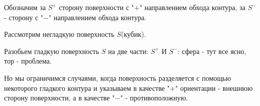 Обозначим за $S^+$ сторону поверхности с "$+$" направлением обхода контура, за $S^-$ - сторону с "$-$" направлением обхода контура.

Рассмотрим негладкую поверхность $S$(кубик). 

Разобьем гладкую поверхность $S$ на две части: $S^+$ И $S^-$: сфера - тут все ясно, тор - проблема.

Но мы ограничимся случаями, когда поверхность разделяется с помощью некоторого гладкого контура и указываем в качестве "$+$" ориентации - внешнюю сторону поверхности, а в качестве "$-$" - противоположную.
